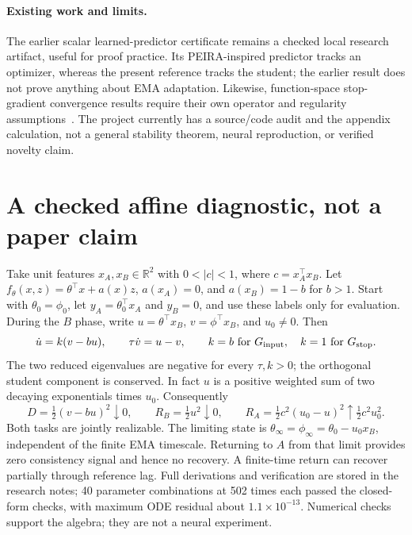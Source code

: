 \documentclass[11pt,a4paper]{article}
\newcommand{\R}{\mathbb{R}}
\begin{document}
\paragraph{Existing work and limits.}
The earlier scalar learned-predictor certificate remains a checked local
research artifact, useful for proof practice. Its PEIRA-inspired predictor
tracks an optimizer, whereas the present reference tracks the student;
the earlier result does not prove anything about EMA adaptation. Likewise,
function-space stop-gradient convergence results require their own operator
and regularity assumptions~\cite{stopgrads}. The project currently has a
source/code audit and the appendix calculation, not a general stability
theorem, neural reproduction, or verified novelty claim.

\medskip
{}

\appendix
\section{A checked affine diagnostic, not a paper claim}
Take unit features $x_A,x_B\in\R^2$ with $0<|c|<1$, where
$c=x_A^\top x_B$. Let $f_\theta(x,z)=\theta^\top x+a(x)z$,
$a(x_A)=0$, and $a(x_B)=1-b$ for $b>1$. Start with
$\theta_0=\phi_0$, let $y_A=\theta_0^\top x_A$ and $y_B=0$, and use
these labels only for evaluation. During the $B$ phase, write
$u=\theta^\top x_B$, $v=\phi^\top x_B$, and $u_0\ne0$. Then
\begin{equation}
 \dot u=k(v-bu),\qquad \tau\dot v=u-v,
 \qquad k=b\ \text{for }G_{\rm input},\quad k=1\ \text{for }G_{\rm stop}.
 \label{eq:toy}
\end{equation}
The two reduced eigenvalues are negative for every $\tau,k>0$; the
orthogonal student component is conserved. In fact $u$ is a positive
weighted sum of two decaying exponentials times $u_0$. Consequently
\begin{equation}
 D=\tfrac12(v-bu)^2\downarrow0,\qquad
 R_B=\tfrac12u^2\downarrow0,\qquad
 R_A=\tfrac12c^2(u_0-u)^2\uparrow\tfrac12c^2u_0^2.
 \label{eq:toyresult}
\end{equation}
Both tasks are jointly realizable. The limiting state is
$\theta_\infty=\phi_\infty=\theta_0-u_0x_B$, independent of the finite
EMA timescale. Returning to $A$ from that limit provides zero consistency
signal and hence no recovery. A finite-time return can recover partially
through reference lag. Full derivations and verification are stored in
the research notes; 40 parameter combinations at 502 times each passed
the closed-form checks, with maximum ODE residual about $1.1\times10^{-13}$.
Numerical checks support the algebra; they are not a neural experiment.
\end{document}

